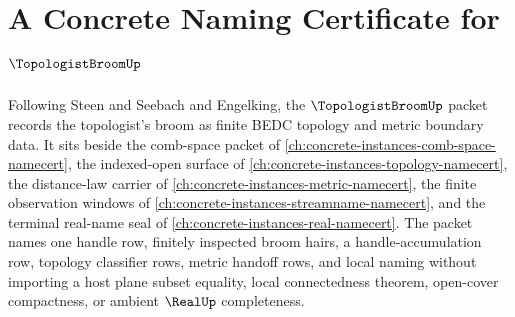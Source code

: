 \chapter{A Concrete Naming Certificate for $\TopologistBroomUp$}
\label{ch:concrete-instances-topologist-broom-namecert}

Following Steen and Seebach and Engelking, the $\TopologistBroomUp$ packet records the topologist's broom as finite BEDC topology and metric boundary data. It sits beside the comb-space packet of \autoref{ch:concrete-instances-comb-space-namecert}, the indexed-open surface of \autoref{ch:concrete-instances-topology-namecert}, the distance-law carrier of \autoref{ch:concrete-instances-metric-namecert}, the finite observation windows of \autoref{ch:concrete-instances-streamname-namecert}, and the terminal real-name seal of \autoref{ch:concrete-instances-real-namecert}. The packet names one handle row, finitely inspected broom hairs, a handle-accumulation row, topology classifier rows, metric handoff rows, and local naming without importing a host plane subset equality, local connectedness theorem, open-cover compactness, or ambient $\RealUp$ completeness.

